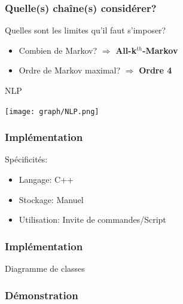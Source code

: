 \documentclass{beamer}
\begin{document}
            \begin{frame}
                \frametitle{Quelle(s) chaîne(s) considérer?}
                Quelles sont les limites qu'il faut s'imposer?
                \begin{itemize}
                    \pause[2]
                    \item Combien de Markov? \pause[3] $\Rightarrow$ \textbf{All-k}$^{th}$\textbf{-Markov}
                    \pause[4]
                    \item Ordre de Markov maximal? \pause[6] $\Rightarrow$ \textbf{Ordre 4}
                    \pause[5]
                \end{itemize}
                \begin{exampleblock}{NLP}
                    \begin{center}
                        \texttt{[image: graph/NLP.png]}
                    \end{center}
                \end{exampleblock}
            \end{frame}
            \begin{frame}
                \frametitle{Implémentation}
                Spécificités:
                \begin{itemize}
                    \pause
                    \item Langage: \pause C++
                    \pause
                    \item Stockage: \pause Manuel
                    \pause
                    \item Utilisation: \pause Invite de commandes/Script
                \end{itemize}
            \end{frame}
            \begin{frame}
                \frametitle{Implémentation}
                \begin{block}{Diagramme de classes}
                    \begin{center}
                        \pause[2]
                    \end{center}
                \end{block}
            \end{frame}
            \begin{frame}
                \frametitle{Démonstration}
            \end{frame}
\end{document}
